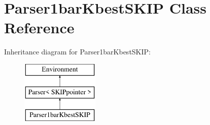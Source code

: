 \hypertarget{classParser1barKbestSKIP}{}\section{Parser1bar\+Kbest\+S\+K\+IP Class Reference}
\label{classParser1barKbestSKIP}
Inheritance diagram for Parser1bar\+Kbest\+S\+K\+IP\+:\begin{figure}[H]
\begin{center}
\leavevmode
\includegraphics[height=3.000000cm]{classParser1barKbestSKIP}
\end{center}
\end{figure}
